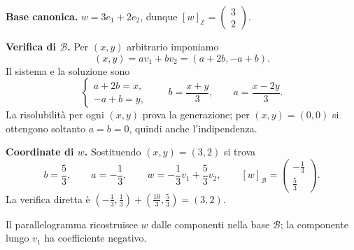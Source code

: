 \begin{svolgimento}
\textbf{Base canonica.} $w=3e_1+2e_2$, dunque $[w]_{\mathcal E}=\left(\begin{smallmatrix}3\\2\end{smallmatrix}\right)$.

\textbf{Verifica di $\mathcal B$.} Per $(x,y)$ arbitrario imponiamo
\[
  (x,y)=av_1+bv_2=(a+2b,-a+b).
\]
Il sistema e la soluzione sono
\[
  \begin{cases}a+2b=x,\\-a+b=y,\end{cases}
  \qquad b=\frac{x+y}{3},\qquad a=\frac{x-2y}{3}.
\]
La risolubilità per ogni $(x,y)$ prova la generazione; per $(x,y)=(0,0)$ si ottengono soltanto $a=b=0$, quindi anche l'indipendenza.

\textbf{Coordinate di $w$.} Sostituendo $(x,y)=(3,2)$ si trova
\[
  b=\frac53,\qquad a=-\frac13,\qquad
  w=-\frac13v_1+\frac53v_2,
  \qquad [w]_{\mathcal B}=\begin{pmatrix}-\frac13\\[2pt]\frac53\end{pmatrix}.
\]
La verifica diretta è $(-\frac13,\frac13)+(\frac{10}3,\frac53)=(3,2)$.
\begin{schema}

Il parallelogramma ricostruisce $w$ dalle componenti nella base $\mathcal B$; la componente lungo $v_1$ ha coefficiente negativo.
\end{schema}
\end{svolgimento}
